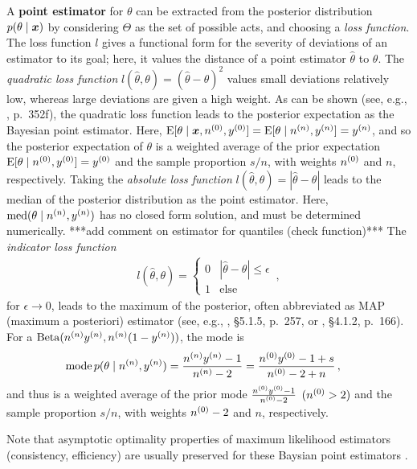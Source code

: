A \textbf{point estimator} for $\theta$ can be extracted from the posterior distribution $p(\theta\mid{\bm x})$
by considering $\Theta$ as the set of possible acts, and choosing a \emph{loss function}.
The loss function $l$ gives a functional form for the severity of deviations of an estimator to its goal;
here, it values the distance of a point estimator $\hat{\theta}$ to $\theta$.
The \emph{quadratic loss function} $l(\hat{\theta}, \theta) = (\hat{\theta}-\theta)^2$
values small deviations relatively low, whereas large deviations are given a high weight.
As can be shown (see, e.g., \textcite{2002:casella}, p.~352f), %
the quadratic loss function leads to the posterior expectation as the Bayesian point estimator.
Here, $\operatorname{E}[\theta\mid{\bm x}, n^{(0)}, y^{(0)}] = \operatorname{E}[\theta\mid n^{(n)}, y^{(n)}] = y^{(n)}$,
and so the posterior expectation of $\theta$ is a weighted average
of the prior expectation $\operatorname{E}[\theta\mid n^{(0)}, y^{(0)}] = y^{(0)}$ and the sample proportion $s/n$, with weights $n^{(0)}$ and $n$, respectively.
Taking the \emph{absolute loss function} $l(\hat{\theta}, \theta) = |\hat{\theta}-\theta|$
leads to the median of the posterior distribution as the point estimator.
Here, $\operatorname{med}(\theta\mid n^{(n)}, y^{(n)})$ has no closed form solution, and must be determined numerically.
***add comment on estimator for quantiles (check function)***
The \emph{indicator loss function}
\begin{align*}
l(\hat{\theta}, \theta) = \begin{cases} 0 & |\hat{\theta}-\theta| \le \epsilon \\ 1 & \text{else}\end{cases}\,,
\end{align*}
for $\epsilon \rightarrow 0$, leads to the maximum of the posterior,
often abbreviated as MAP (maximum a posteriori) estimator
(see, e.g., \textcite{2000:bernardosmith}, \S 5.1.5, p.~257, or \textcite{2007:robert}, \S 4.1.2, p.~166).
For a $\operatorname{Beta}(n^{(n)}y^{(n)}, n^{(n)}(1-y^{(n)}))$, the mode is
\begin{align*}
\operatorname{mode} p(\theta\mid n^{(n)}, y^{(n)}) &= \frac{n^{(n)}y^{(n)} - 1}{n^{(n)} - 2} = \frac{n^{(0)}y^{(0)} - 1 + s}{n^{(0)} - 2 + n}\,,
\end{align*}
and thus is a weighted average of the prior mode $\frac{n^{(0)}y^{(0)} - 1}{n^{(0)} -2}$ $(n^{(0)} > 2)$
and the sample proportion $s/n$, with weights $n^{(0)} - 2$ and $n$, respectively.

Note that asymptotic optimality properties of maximum likelihood estimators (consistency, efficiency)
are usually preserved for these Baysian point estimators \parencite[Note~1.8.4, p.~48f]{2007:robert}.

